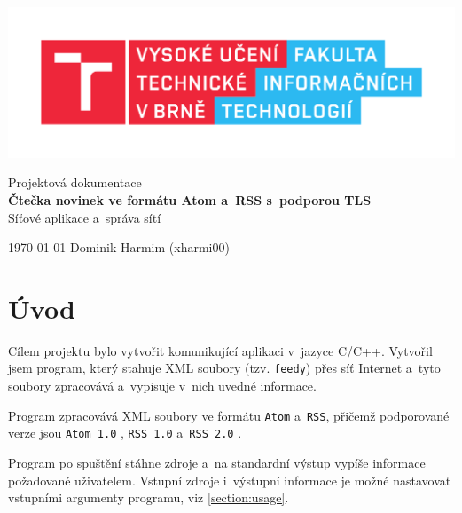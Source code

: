 \documentclass[a4paper, 11pt]{article}
\begin{document}
	\begin{titlepage}
		\begin{center}
			\includegraphics[width=0.77\linewidth]{inc/FIT_logo.pdf} \\


			\Huge{Projektová dokumentace} \\
			\LARGE{\textbf{
				Čtečka novinek ve formátu Atom a~RSS s~podporou TLS
			}} \\
			\Large{Síťové aplikace a~správa sítí}

		\end{center}

		{\Large
			\today
			\hfill
			Dominik Harmim (xharmi00)
		}
	\end{titlepage}



	\setcounter{page}{1}
	\tableofcontents
	\clearpage



	\setcounter{page}{1}

	\section{Úvod}

	Cílem projektu bylo vytvořit komunikující aplikaci v~jazyce C/C++.
	Vytvořil jsem program, který stahuje XML soubory (tzv. \texttt{feedy})
	přes síť Internet a~tyto soubory zpracovává a~vypisuje v~nich uvedné
	informace.

	Program zpracovává XML soubory ve formátu \texttt{Atom} a~\texttt{RSS},
	přičemž podporované verze jsou \texttt{Atom 1.0} \cite{atom},
	\texttt{RSS 1.0} \cite{rss1} a~\texttt{RSS 2.0} \cite{rss2}.

	Program po spuštění stáhne zdroje a~na standardní výstup vypíše informace
	požadované uživatelem. Vstupní zdroje i~výstupní informace je možné
	nastavovat vstupními argumenty programu, viz \ref{section:usage}.
\end{document}
